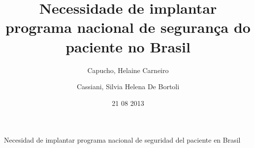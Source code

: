 \documentclass{article}
\title{Necessidade de implantar programa nacional de segurança do
          paciente no Brasil\titlegroup{}}
\author[%
I]{%
Capucho, %
Helaine Carneiro}
\author[%
II]{%
Cassiani, %
Silvia Helena De Bortoli}
\affil[%
I]{%
Ministério da Saúde}
\affil[%
II]{%
Universidade de São Paulo}
\date{%
21 %
08 %
2013}
\begin{document}
\newcommand{\lingua}{Português}
\maketitle
\tableofcontents

Necesidad de implantar programa nacional de seguridad del paciente en
            Brasil%
\end{document}
